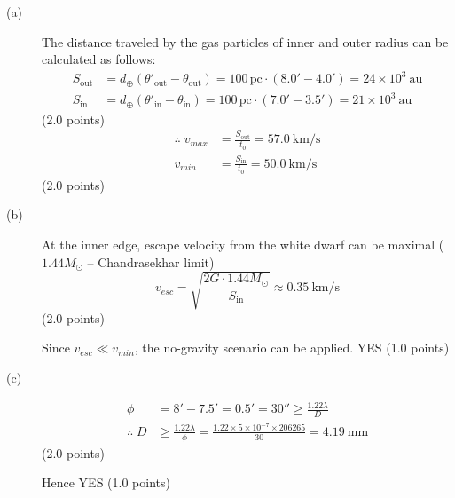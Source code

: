 \begin{description}
\item[(a)] The distance traveled by the gas particles of inner and outer radius
  can be calculated as follows:
  \begin{align*}
    S_{\mathrm{out}} &= d_\oplus(\theta'_{\mathrm{out}} - \theta_{\mathrm{out}})
      = 100\,\mathrm{pc}\cdot(8.0' - 4.0') = 24\times10^{3}\ \mathrm{au} \\
    S_{\mathrm{in}} &= d_\oplus(\theta'_{\mathrm{in}} - \theta_{\mathrm{in}})
      = 100\,\mathrm{pc}\cdot(7.0' - 3.5') = 21\times10^{3}\ \mathrm{au}
  \end{align*}
  \hfill(2.0 points)
  \begin{align*}
    \therefore\; v_{max} &= \frac{S_{\mathrm{out}}}{t_0} = 57.0\ \mathrm{km/s} \\
    v_{min} &= \frac{S_{\mathrm{in}}}{t_0} = 50.0\ \mathrm{km/s}
  \end{align*}
  \hfill(2.0 points)
\item[(b)] At the inner edge, escape velocity from the white dwarf can be
  maximal ($1.44M_\odot$ -- Chandrasekhar limit)
  \[
    v_{esc} = \sqrt{\frac{2G\cdot1.44M_\odot}{S_{\mathrm{in}}}}
      \approx 0.35\ \mathrm{km/s}
  \]
  \hfill(2.0 points)

  Since $v_{esc} \ll v_{min}$, the no-gravity scenario can be applied. YES
  \hfill(1.0 points)
\item[(c)]
  \begin{align*}
    \phi &= 8' - 7.5' = 0.5' = 30'' \ge \frac{1.22\lambda}{D} \\
    \therefore\; D &\ge \frac{1.22\lambda}{\phi}
      = \frac{1.22\times5\times10^{-7}\times206265}{30} = 4.19\ \mathrm{mm}
  \end{align*}
  \hfill(2.0 points)

  Hence YES
  \hfill(1.0 points)
\end{description}
